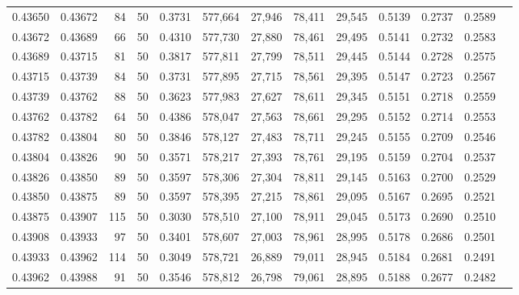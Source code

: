 \begin{tabular}{rrrrrrrrrrrrr}
0.43650 & 0.43672 &    84 &  50 &                                     0.3731 & 577,664 &  27,946 &  78,411 &  29,545 & 0.5139 & 0.2737 & 0.2589 \\
0.43672 & 0.43689 &    66 &  50 &                                     0.4310 & 577,730 &  27,880 &  78,461 &  29,495 & 0.5141 & 0.2732 & 0.2583 \\
0.43689 & 0.43715 &    81 &  50 &                                     0.3817 & 577,811 &  27,799 &  78,511 &  29,445 & 0.5144 & 0.2728 & 0.2575 \\
0.43715 & 0.43739 &    84 &  50 &                                     0.3731 & 577,895 &  27,715 &  78,561 &  29,395 & 0.5147 & 0.2723 & 0.2567 \\
0.43739 & 0.43762 &    88 &  50 &                                     0.3623 & 577,983 &  27,627 &  78,611 &  29,345 & 0.5151 & 0.2718 & 0.2559 \\
0.43762 & 0.43782 &    64 &  50 &                                     0.4386 & 578,047 &  27,563 &  78,661 &  29,295 & 0.5152 & 0.2714 & 0.2553 \\
0.43782 & 0.43804 &    80 &  50 &                                     0.3846 & 578,127 &  27,483 &  78,711 &  29,245 & 0.5155 & 0.2709 & 0.2546 \\
0.43804 & 0.43826 &    90 &  50 &                                     0.3571 & 578,217 &  27,393 &  78,761 &  29,195 & 0.5159 & 0.2704 & 0.2537 \\
0.43826 & 0.43850 &    89 &  50 &                                     0.3597 & 578,306 &  27,304 &  78,811 &  29,145 & 0.5163 & 0.2700 & 0.2529 \\
0.43850 & 0.43875 &    89 &  50 &                                     0.3597 & 578,395 &  27,215 &  78,861 &  29,095 & 0.5167 & 0.2695 & 0.2521 \\
0.43875 & 0.43907 &   115 &  50 &                                     0.3030 & 578,510 &  27,100 &  78,911 &  29,045 & 0.5173 & 0.2690 & 0.2510 \\
0.43908 & 0.43933 &    97 &  50 &                                     0.3401 & 578,607 &  27,003 &  78,961 &  28,995 & 0.5178 & 0.2686 & 0.2501 \\
0.43933 & 0.43962 &   114 &  50 &                                     0.3049 & 578,721 &  26,889 &  79,011 &  28,945 & 0.5184 & 0.2681 & 0.2491 \\
0.43962 & 0.43988 &    91 &  50 &                                     0.3546 & 578,812 &  26,798 &  79,061 &  28,895 & 0.5188 & 0.2677 & 0.2482 \\

\end{tabular}
